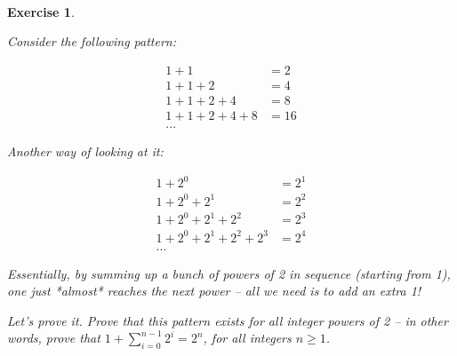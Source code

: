 \documentclass{article}
\newtheorem{exercise}{\\ \bf Exercise}
\begin{document}
\begin{exercise}
\label{power-2-sum}

Consider the following pattern:

\begin{align*}
1 + 1 &= 2 \\
1 + 1 + 2 &= 4 \\
1 + 1 + 2 + 4 &= 8 \\
1 + 1 + 2 + 4 + 8 &= 16 \\
...
\end{align*}


Another way of looking at it:

\begin{align*}
1 + 2^0 &= 2^1 \\
1 + 2^0 + 2^1 &= 2^2 \\
1 + 2^0 + 2^1 + 2^2 &= 2^3 \\
1 + 2^0 + 2^1 + 2^2 + 2^3 &= 2^4 \\
...
\end{align*}


Essentially, by summing up a bunch of powers of 2 in sequence (starting from 1), one just *almost* reaches the next power -- all we need is to add an extra 1!


Let's prove it. Prove that this pattern exists for all integer powers of 2 -- in other words, prove that $1 + \sum_{i=0}^{n-1} 2^i = 2^n$, for all integers $n \geq 1$.

\end{exercise}
\end{document}
